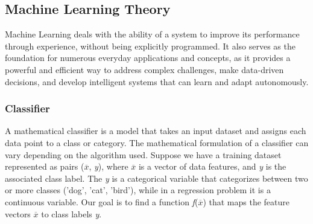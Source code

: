 \subsection{Machine Learning Theory}
Machine Learning deals with the ability of a system to improve its performance through experience, without being explicitly programmed.
It also serves as the foundation for numerous everyday applications and concepts, 
as it provides a powerful and efficient way to address complex challenges, make data-driven decisions, 
and develop intelligent systems that can learn and adapt autonomously.

\subsubsection{Classifier}
A mathematical classifier is a model that takes an input dataset and assigns each data point to a class or category. 
The mathematical formulation of a classifier can vary depending on the algorithm used. 
Suppose we have a training dataset represented as pairs (\textit{$\overline{x}$}, \textit{y}), where \textit{$\overline{x}$} is a vector of data features, and \textit{y} is the associated class label.
The \textit{y} is a categorical variable that categorizes between two or more classes ('dog', 'cat', 'bird'), while in a regression problem it is a continuous variable.
Our goal is to find a function \textit{f}(\textit{$\overline{x}$}) that maps the feature vectors \textit{$\overline{x}$} to class labels \textit{y}. 


